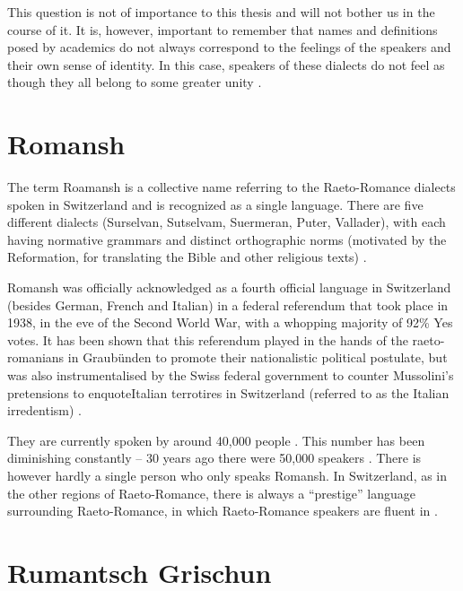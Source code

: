 This question is not of importance to this thesis and will not bother us in the course of it. 
It is, however, important to remember that names and definitions posed by academics do not always correspond to the feelings of the speakers and their own sense of identity. 
In this case, speakers of these dialects do not feel as though they all belong to some greater unity \autocite[175]{bossong2008}.

\section{Romansh}
The term Roamansh is a collective name referring to the Raeto-Romance dialects spoken in Switzerland and is recognized as a single language. 
There are five different dialects (Surselvan, Sutselvam, Suermeran, Puter, Vallader), with each having normative grammars and distinct orthographic norms (motivated by the Reformation, for translating the Bible and other religious texts) \autocites[1]{haiman1992}[178]{bossong2008}.

Romansh was officially acknowledged as a fourth official language in Switzerland (besides German, French and Italian) in a federal referendum that took place in 1938, in the eve of the Second World War, with a whopping majority of 92\% Yes votes. 
It has been shown that this referendum played in the hands of the raeto-romanians in Graubünden to promote their nationalistic political postulate, but was also instrumentalised by the Swiss federal government to counter Mussolini's pretensions to enquote{Italian} terrotires in Switzerland (referred to as the Italian irredentism) \autocite{valaer2012}.

They are currently spoken by around 40,000 people \autocite{bundesamt2020}. 
This number has been diminishing constantly -- 30 years ago there were 50,000 speakers \autocite{haiman1992}. 
There is however hardly a single person who only speaks Romansh. 
In Switzerland, as in the other regions of Raeto-Romance, there is always a \enquote{prestige} language surrounding Raeto-Romance, in which Raeto-Romance speakers are fluent in \autocite[3]{haiman1992}. 

\section{Rumantsch Grischun}
